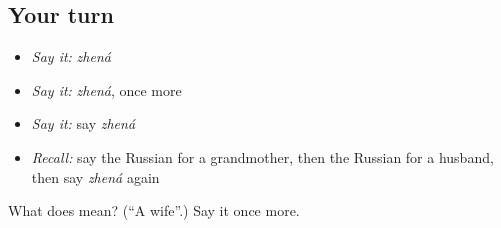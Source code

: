 \subsection*{Your turn}
\begin{itemize}
\raggedright
  \item \emph{Say it:} \emph{zhená}
  \item \emph{Say it:} \emph{zhená}, once more
  \item \emph{Say it:} say \emph{zhená}
  \item \emph{Recall:} say the Russian for a grandmother, then the Russian for a husband, then say \emph{zhená} again
\end{itemize}

\begin{tcolorbox}[breakable,colback=teal!4,colframe=teal!35!black,title={Before you move on}]
What does  mean? (\textquotedblleft{}A wife\textquotedblright{}.) Say it once more.
\end{tcolorbox}
